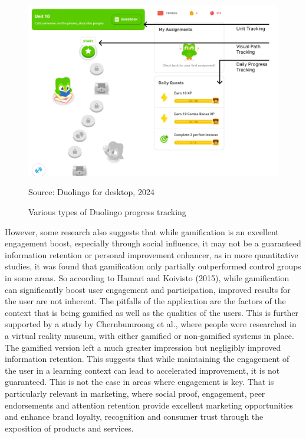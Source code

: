 \begin{figure}[htbp]
 \centering
 \includegraphics[width=14cm]{Media/DuolingoProgress.png}
 \caption{Various types of Duolingo progress tracking}
 \label{fig:duolingoProgress}
  {\raggedright \small{Source: Duolingo for desktop, 2024}\par}
\end{figure}

However, some research also suggests that while gamification is an excellent engagement boost, especially through social influence, it may not be a guaranteed information retention or personal improvement enhancer, as in more quantitative studies, it was found that gamification only partially outperformed control groups in some areas\cite{doesItWork}. 
So according to Hamari and Koivisto (2015), while gamification can significantly boost user engagement and participation, improved results for the user are not inherent. 
The pitfalls of the application are the factors of the context that is being gamified as well as the qualities of the users. 
This is further supported by a study by Chernbumroong et al., where people were researched in a virtual reality museum, with either gamified or non-gamified systems in place. 
The gamified version left a much greater impression but negligibly improved information retention\cite{VR}. 
This suggests that while maintaining the engagement of the user in a learning context can lead to accelerated improvement, it is not guaranteed. 
This is not the case in areas where engagement is key. 
That is particularly relevant in marketing, where social proof, engagement, peer endorsements and attention retention provide excellent marketing opportunities and enhance brand loyalty, recognition and consumer trust through the exposition of products and services.

